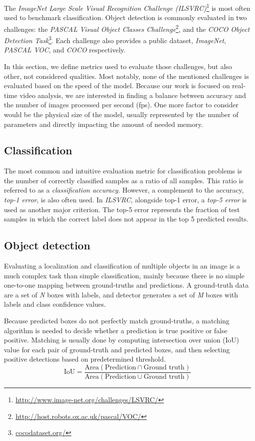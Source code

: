 The \textit{ImageNet Large Scale Visual Recognition Challenge (ILSVRC)}\footnote{\url{http://www.image-net.org/challenges/LSVRC/}} is most often used to benchmark classification. Object detection is commonly evaluated in two challenges: the \textit{PASCAL Visual Object Classes Challenge}\footnote{\url{http://host.robots.ox.ac.uk/pascal/VOC/}}, and the \textit{COCO Object Detection Task}\footnote{\url{cocodataset.org/}}. Each challenge also provides a public dataset, \textit{ImageNet}, \textit{PASCAL VOC}, and \textit{COCO} respectively.

In this section, we define metrics used to evaluate those challenges, but also other, not considered qualities. Most notably, none of the mentioned challenges is evaluated based on the speed of the model. Because our work is focused on real-time video analysis, we are interested in finding a balance between accuracy and the number of images processed per second (fps). One more factor to consider would be the physical size of the model, usually represented by the number of parameters and directly impacting the amount of needed memory.

\subsection{Classification}
The most common and intuitive evaluation metric for classification problems is the number of correctly classified samples as a ratio of all samples. This ratio is referred to as a \textit{classification accuracy}. However, a complement to the accuracy, \textit{top-1 error}, is also often used. In \textit{ILSVRC},  alongside top-1 error, a \textit{top-5 error} is used as another major criterion. The top-5 error represents the fraction of test samples in which the correct label does not appear in the top 5 predicted results.

\subsection{Object detection}
Evaluating a localization and classification of multiple objects in an image is a much complex task than simple classification, mainly because there is no simple one-to-one mapping between ground-truths and predictions. A ground-truth data are a set of \textit{N} boxes with labels, and detector generates a set of \textit{M} boxes with labels and class confidence values.

Because predicted boxes do not perfectly match ground-truths, a matching algorithm is needed to decide whether a prediction is true positive or false positive. Matching is usually done by computing intersection over union (IoU) value for each pair of ground-truth and predicted boxes, and then selecting positive detections based on predetermined threshold.
$$\text{IoU} = \frac{\text{Area}(\text{Prediction} \cap \text{Ground truth})}{\text{Area}(\text{Prediction} \cup \text{Ground truth})}$$

